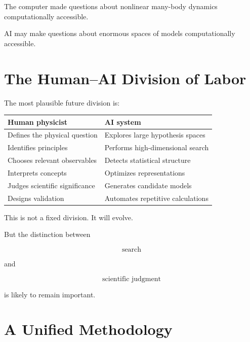 \documentclass[11pt,a4paper,oneside]{book}
\begin{document}
The computer made questions about nonlinear many-body dynamics computationally
accessible.

AI may make questions about enormous spaces of models computationally
accessible.

\chapter{The Human--AI Division of Labor}

The most plausible future division is:

\begin{center}
\begin{tabular}{p{}p{}}
\toprule
Human physicist & AI system\\
\midrule
Defines the physical question & Explores large hypothesis spaces\\
Identifies principles & Performs high-dimensional search\\
Chooses relevant observables & Detects statistical structure\\
Interprets concepts & Optimizes representations\\
Judges scientific significance & Generates candidate models\\
Designs validation & Automates repetitive calculations\\
\bottomrule
\end{tabular}
\end{center}

This is not a fixed division. It will evolve.

But the distinction between

\begin{equation}
\text{search}
\end{equation}

and

\begin{equation}
\text{scientific judgment}
\end{equation}

is likely to remain important.

\chapter{A Unified Methodology}
\end{document}
